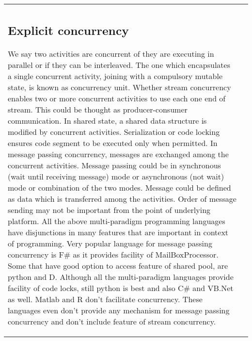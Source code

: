 \documentclass{sig-alternate}
\begin{document}
\begin{table}[]
\begin{tabular}{|l|l|}
\subsection{Explicit concurrency}
We say two activities are concurrent of they are executing in parallel or if they can be interleaved. The one which encapsulates a single concurrent activity, joining with a compulsory mutable state, is known as concurrency unit. Whether stream concurrency enables two or more concurrent activities to use each one end of stream. This could be thought as producer-consumer communication. In shared state, a shared data structure is modified by concurrent activities. Serialization or code locking ensures code segment to be executed only when permitted. In message passing concurrency, messages are exchanged among the concurrent activities. Message passing could be in synchronous (wait until receiving message) mode or asynchronous (not wait) mode or combination of the two modes. Message could be defined as data which is transferred among the activities. Order of message sending may not be important from the point of underlying platform.
All the above multi-paradigm programming languages have disjunctions in many features that are important in context of programming. Very popular language for message passing concurrency is F# as it provides facility of MailBoxProcessor. Some that have good option to access feature of shared pool, are python and D. Although all the multi-paradigm languages provide facility of code locks, still python is best and also C# and VB.Net as well. Matlab and R don’t facilitate concurrency. These languages even don’t provide any mechanism for message passing concurrency and don’t include feature of stream concurrency.



\end{tabular}
\end{table}
\end{document}
